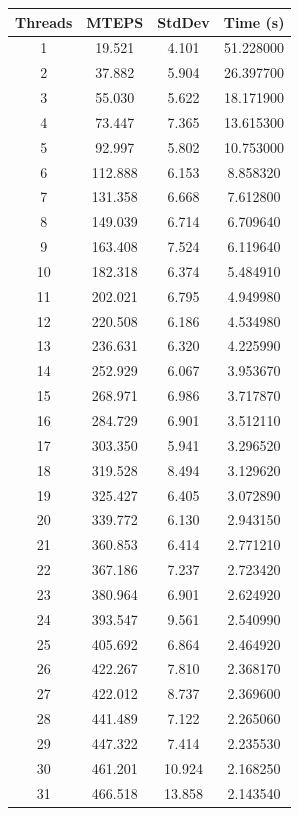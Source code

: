 \documentclass[10pt,twocolumn,letterpaper]{article}
\begin{document}
\begin{table}[h]
\renewcommand\arraystretch{0.8}
\centering
\begin{tabular}{@{}c|ccc@{}}
\toprule
Threads          & MTEPS  & StdDev     & Time (s)      \\ \midrule
1 & 19.521 & 4.101 & 51.228000 \\
2 & 37.882 & 5.904 & 26.397700 \\
3 & 55.030 & 5.622 & 18.171900 \\
4 & 73.447 & 7.365 & 13.615300 \\
5 & 92.997 & 5.802 & 10.753000 \\
6 & 112.888 & 6.153 & 8.858320 \\
7 & 131.358 & 6.668 & 7.612800 \\
8 & 149.039 & 6.714 & 6.709640 \\
9 & 163.408 & 7.524 & 6.119640 \\
10 & 182.318 & 6.374 & 5.484910 \\
11 & 202.021 & 6.795 & 4.949980 \\
12 & 220.508 & 6.186 & 4.534980 \\
13 & 236.631 & 6.320 & 4.225990 \\
14 & 252.929 & 6.067 & 3.953670 \\
15 & 268.971 & 6.986 & 3.717870 \\
16 & 284.729 & 6.901 & 3.512110 \\
17 & 303.350 & 5.941 & 3.296520 \\
18 & 319.528 & 8.494 & 3.129620 \\
19 & 325.427 & 6.405 & 3.072890 \\
20 & 339.772 & 6.130 & 2.943150 \\
21 & 360.853 & 6.414 & 2.771210 \\
22 & 367.186 & 7.237 & 2.723420 \\
23 & 380.964 & 6.901 & 2.624920 \\
24 & 393.547 & 9.561 & 2.540990 \\
25 & 405.692 & 6.864 & 2.464920 \\
26 & 422.267 & 7.810 & 2.368170 \\
27 & 422.012 & 8.737 & 2.369600 \\
28 & 441.489 & 7.122 & 2.265060 \\
29 & 447.322 & 7.414 & 2.235530 \\
30 & 461.201 & 10.924 & 2.168250 \\
31 & 466.518 & 13.858 & 2.143540 \\

\end{tabular}
\end{table}
\end{document}
